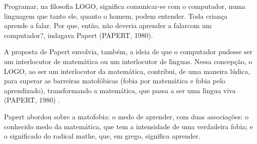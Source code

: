 \documentclass[
12pt,		%
openright,	%
twoside,  %
a4paper,			%
chapter=TITLE,		%
english,			%
french,				%
spanish,			%
brazil				%
]{USPSC-classe/USPSC}
\begin{document}
Programar, na filosofia LOGO, significa \textquotedbl comunicar-se com o computador, numa linguagem que tanto ele, quanto o homem,  podem entender\textquotedbl . Toda crian\c{c}a aprende a falar. Por que, ent\~ao, n\~ao deveria aprender a \textquotedbl falar\textquotedbl  com um computador?\textquotedbl , indagava Papert  (PAPERT, 1980).

















A proposta de Papert envolvia, tamb\'em, a ideia de que o computador pudesse ser um interlocutor  de matem\'atica ou um interlocutor de l\'{\i}nguas. Nessa concep\c{c}\~ao, o LOGO, ao ser um interlocutor da matem\'atica, contribui, de uma maneira l\'udica, para superar as barreiras matof\'obicas (fobia por matem\'atica e fobia pelo aprendizado), transformando a matem\'atica, que passa a ser uma l\'{\i}ngua viva  (PAPERT, 1980) .

















Papert abordou sobre a \textquotedbl matofobia: o medo de aprender\textquotedbl , com duas associa\c{c}\~oes: o conhecido medo da matem\'atica, que tem a intensidade de uma verdadeira fobia; e o  significado do radical mathe, que, em grego, significa aprender.


















\noindent\begin{center}\mbox{\centering{}}\end{center}
\end{document}
